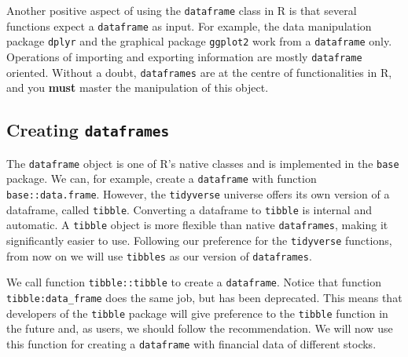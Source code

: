 \documentclass[
  12pt,
]{book}
\begin{document}
Another positive aspect of using the \texttt{dataframe} class in R is that several functions expect a \texttt{dataframe} as input. For example, the data manipulation package \texttt{dplyr} \citep{R-dplyr} and the graphical package \texttt{ggplot2} \citep{R-ggplot2} work from a \texttt{dataframe} only. Operations of importing and exporting information are mostly \texttt{dataframe} oriented. Without a doubt, \texttt{dataframes} are at the centre of functionalities in R, and you \textbf{must} master the manipulation of this object.

\hypertarget{creating-dataframes}{%
\subsection{\texorpdfstring{Creating \texttt{dataframes}}{Creating dataframes}}\label{creating-dataframes}}

The \texttt{dataframe} object is one of R's native classes and is implemented in the \texttt{base} package. We can, for example, create a \texttt{dataframe} with function \texttt{base::data.frame}. However, the \texttt{tidyverse} universe offers its own version of a dataframe, called \texttt{tibble}. Converting a dataframe to \texttt{tibble} is internal and automatic. A \texttt{tibble} object is more flexible than native \texttt{dataframes}, making it significantly easier to use. Following our preference for the \texttt{tidyverse} functions, from now on we will use \texttt{tibbles} as our version of \texttt{dataframes}. 

We call function \texttt{tibble::tibble} to create a \texttt{dataframe}. Notice that function \texttt{tibble:data\_frame} does the same job, but has been deprecated. This means that developers of the \texttt{tibble} package will give preference to the \texttt{tibble} function in the future and, as users, we should follow the recommendation. We will now use this function for creating a \texttt{dataframe} with financial data of different stocks.   
\end{document}

